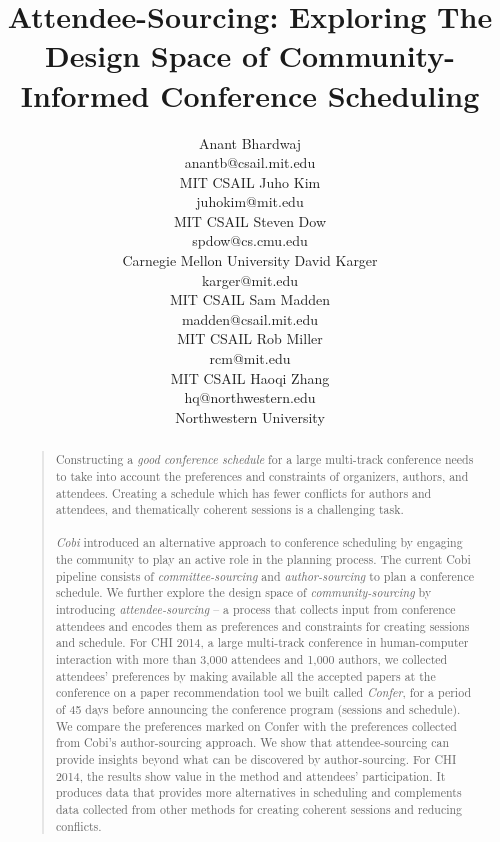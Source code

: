 \documentclass[letterpaper]{article}
\begin{document}
%
\title{Attendee-Sourcing: Exploring The Design Space of Community-Informed Conference Scheduling}
\author{
Anant Bhardwaj \\
anantb@csail.mit.edu\\
MIT CSAIL
\And
Juho Kim\\
juhokim@mit.edu\\
MIT CSAIL
\And
Steven Dow \\
spdow@cs.cmu.edu\\
Carnegie Mellon University
\AND
David Karger \\
karger@mit.edu\\
MIT CSAIL
\And
Sam Madden \\
madden@csail.mit.edu\\
MIT CSAIL
\And
Rob Miller\\
rcm@mit.edu\\
MIT CSAIL
\And
Haoqi Zhang \\
hq@northwestern.edu\\
Northwestern University
}
\maketitle
\begin{abstract}
\begin{quote}
Constructing a \emph{good conference schedule} for a large multi-track conference needs to take into account the preferences and constraints of organizers, authors, and attendees. Creating a schedule which has fewer conflicts for authors and attendees, and thematically coherent sessions is a challenging task. 
\\
\\
\emph{Cobi} introduced an alternative approach to conference scheduling by engaging the community to play an active role in the planning process. The current Cobi pipeline consists of \emph{committee-sourcing} and \emph{author-sourcing} to plan a conference schedule. We further explore the design space of \emph{community-sourcing} by introducing \emph{attendee-sourcing} -- a process that collects input from conference attendees and encodes them as preferences and constraints for creating sessions and schedule.  For CHI 2014, a large multi-track conference in human-computer interaction with more than 3,000 attendees and 1,000 authors, we collected attendees' preferences by making available all the accepted papers at the conference on a paper recommendation tool we built called \emph{Confer}, for a period of 45 days before announcing the conference program (sessions and schedule). We compare the preferences marked on Confer with the preferences collected from Cobi's author-sourcing approach. We show that attendee-sourcing can provide insights beyond what can be discovered by author-sourcing. For CHI 2014, the results show value in the method and attendees' participation. It produces data that provides more alternatives in scheduling and complements data collected from other methods for creating coherent sessions and reducing conflicts.
\end{quote}
\end{abstract}
\noindent
\end{document}
